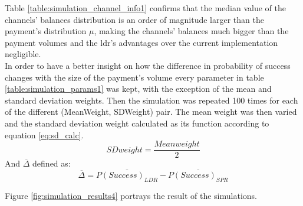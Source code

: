 \begin{table}[H]
\centering
{}
\caption{Median channel balance and payment volume distribution parameters for the first simulation}
\label{table:simulation_channel_info1}
\end{table}

Table \ref{table:simulation_channel_info1} confirms that the median value of the channels' balances distribution is an order of magnitude larger than the payment's distribution $\mu$, making the channels' balances much bigger than the payment volumes and the \acrshort{ldr}'s advantages over the current implementation negligible. \\
In order to have a better insight on how the difference in probability of success changes with the size of the payment's volume every parameter in table \ref{table:simulation_params1} was kept, with the exception of the mean and standard deviation weights. Then the simulation was repeated 100 times for each of the different (MeanWeight, SDWeight) pair.
The mean weight was then varied and the standard deviation weight calculated as its function according to equation \ref{eq:sd_calc}.
\begin{equation}
    SD weight = \frac{Mean weight}{2}
    \label{eq:sd_calc}
\end{equation}
And $\overline{\Delta}$ defined as:
\begin{equation}
    \overline{\Delta} = \overline{P(Success)_{LDR}} - \overline{P(Success)_{SPR}}
\end{equation}

Figure \ref{fig:simulation_results4} portrays the result of the simulations.

